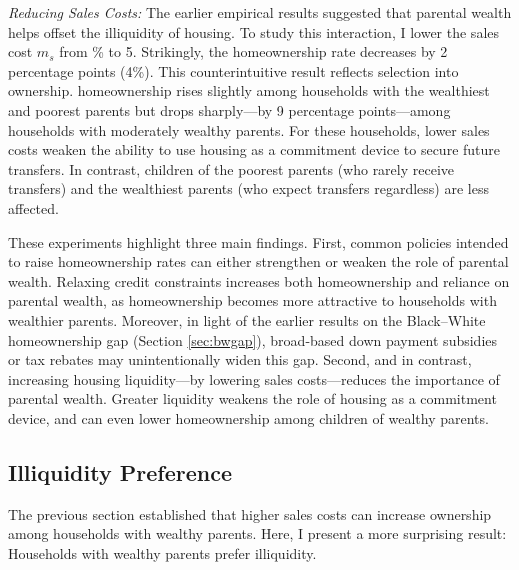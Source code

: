 \documentclass[12pt]{article}
\begin{document}
\textit{Reducing Sales Costs:} 
The earlier empirical results suggested that parental wealth helps offset the illiquidity of housing. To study this interaction, I lower the sales cost $m_s$ from \parms\% to 5. Strikingly, the homeownership rate decreases by 2 percentage points (4\%). This counterintuitive result reflects selection into ownership. homeownership rises slightly among households with the wealthiest and poorest parents but drops sharply---by 9 percentage points---among households with moderately wealthy parents. For these households, lower sales costs weaken the ability to use housing as a commitment device to secure future transfers. In contrast, children of the poorest parents (who rarely receive transfers) and the wealthiest parents (who expect transfers regardless) are less affected.



\begin{table}[tb]
	\centering
\end{table}

These experiments highlight three main findings. First, common policies intended to raise homeownership rates can either strengthen or weaken the role of parental wealth. Relaxing credit constraints increases both homeownership and reliance on parental wealth, as homeownership becomes more attractive to households with wealthier parents. Moreover, in light of the earlier results on the Black–White homeownership gap (Section \ref{sec:bwgap}), broad-based down payment subsidies or tax rebates may unintentionally widen this gap. Second, and in contrast, increasing housing liquidity---by lowering sales costs---reduces the importance of parental wealth. Greater liquidity weakens the role of housing as a commitment device, and can even lower homeownership among children of wealthy parents. 

\subsection{Illiquidity Preference}\label{sec:adjcost}
The previous section established that higher sales costs can increase ownership among households with wealthy parents. Here, I present a more surprising result: Households with wealthy parents prefer illiquidity.
\end{document}
